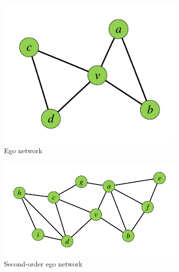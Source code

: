 \begin{figure}[t]
        \begin{subfigure}[b]{0.3\textwidth}
                \includegraphics[width=\textwidth]{./images/ego2.pdf}
                \caption{Ego network}
                \label{fig:1-b}
        \end{subfigure}
        \begin{subfigure}[b]{0.5\textwidth}
                \includegraphics[width=\textwidth]{./images/second-order.pdf}
                \caption{Second-order ego network}
                \label{fig:1-c}
        \end{subfigure}
        \begin{subfigure}[b]{0.3\textwidth}

\end{subfigure}
\end{figure}
